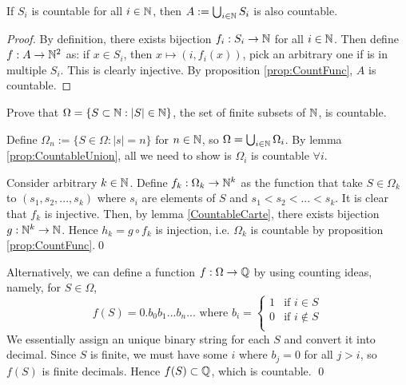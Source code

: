 \documentclass[11pt]{article}
\begin{document}
\begin{proposition}
  If \(S_i\) is countable for all \(i\in\mathbb{N}\), then \(A:= \bigcup_{i\in\mathbb{N}}S_i\) is also countable.
\end{proposition}
\begin{proof}
  By definition, there exists bijection \(f_i:S_i\to\mathbb{N}\) for all \(i\in\mathbb{N}\). Then define \(f:A\to\mathbb{N}^2\) as: if \(x \in S_i\), then \(x \mapsto (i,f_i(x))\), pick an arbitrary one if is in multiple \(S_i\). This is clearly injective. By proposition \ref{prop:CountFunc}, \(A\) is countable.
\end{proof}

\begin{problem}
  Prove that \(\Omega = \{S\subset\mathbb{N}:|S| \in \mathbb{N}\}\), the set of finite subsets of \(\mathbb{N}\), is countable.
\end{problem}
\begin{solution}
  Define \(\Omega_n := \{S\in\Omega:|s|=n\}\) for \(n\in\mathbb{N}\), so \(\Omega=\bigcup_{i\in\mathbb{N}}\Omega_i\). By lemma \ref{prop:CountableUnion}, all we need to show is \(\Omega_i\) is countable \(\forall i\). 

  \vspace{5pt}Consider arbitrary \(k\in\mathbb{N}\). Define \(f_k:\Omega_k\to\mathbb{N}^k\) as the function that take \(S\in\Omega_k\) to \((s_1,s_2,...,s_k)\) where \(s_i\) are elements of \(S\) and \(s_1<s_2<...<s_k\). It is clear that \(f_k\) is injective. Then, by lemma \ref{CountableCarte}, there exists bijection \(g:\mathbb{N}^k\to\mathbb{N}\). Hence \(h_k=g\circ f_k\) is injection, i.e. \(\Omega_k\) is countable by proposition \ref{prop:CountFunc}.\qed

  \vspace{5pt}Alternatively, we can define a function \(f:\Omega\to\mathbb{Q}\) by using counting ideas, namely, for \(S \in \Omega\),
  \[f(S)=0.b_0b_1...b_n... \text{ where } b_i=\begin{cases}
    1 & \text{if } i \in S \\
    0 & \text{if } i \notin S \\
  \end{cases}\]
  We essentially assign an unique binary string for each \(S\) and convert it into decimal. Since \(S\) is finite, we must have some \(i\) where \(b_j=0\) for all \(j>i\), so \(f(S)\) is finite decimals. Hence \(f(S)\subset \mathbb{Q}\), which is countable.
  \qed
\end{solution}
\end{document}
